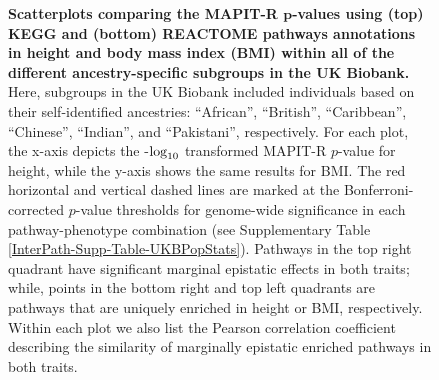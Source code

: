 \documentclass[10pt]{article}
\def\log{{\rm log}}
\begin{document}
\begin{landscape}
\begin{figure}[htbp]
\caption{\textbf{Scatterplots comparing the MAPIT-R $\bm{p}$-values using (top) KEGG and (bottom) REACTOME pathways annotations in height and body mass index (BMI) within all of the different ancestry-specific subgroups in the UK Biobank.} Here, subgroups in the UK Biobank included individuals based on their self-identified ancestries: ``African'', ``British'', ``Caribbean'', ``Chinese'', ``Indian'', and ``Pakistani'', respectively. For each plot, the x-axis depicts the -$\log_{10}$ transformed MAPIT-R $p$-value for height, while the y-axis shows the same results for BMI. The red horizontal and vertical dashed lines are marked at the Bonferroni-corrected $p$-value thresholds for genome-wide significance in each pathway-phenotype combination (see Supplementary Table \ref{InterPath-Supp-Table-UKBPopStats}). Pathways in the top right quadrant have significant marginal epistatic effects in both traits; while, points in the bottom right and top left quadrants are pathways that are uniquely enriched in height or BMI, respectively. Within each plot we also list the Pearson correlation coefficient describing the similarity of marginally epistatic enriched pathways in both traits.}
\label{InterPath-Supp-Figure-MAPITR-PhenoComps-AllPops}
\end{figure}
\clearpage
\setlength{\footskip}{1cm}
\end{landscape}
\end{document}
